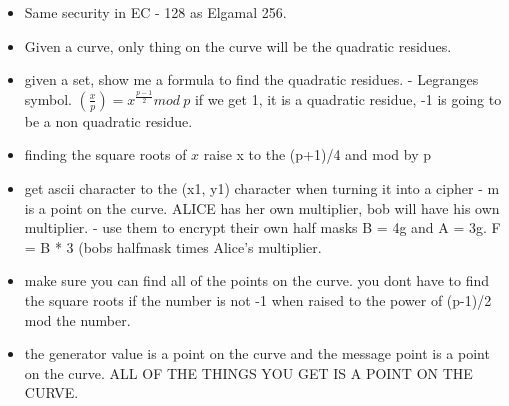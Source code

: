 \documentclass[12pt]{amsart}
\begin{document}
\begin{itemize}
	\begin{itemize}
	\item{}Same security in EC - 128 as Elgamal 256.\\
	\item{}Given a curve, only thing on the curve will be the quadratic residues.\\
	\item{}given a set, show me a formula to find the quadratic residues. - Legranges symbol. $(\frac{x}{p}) = x ^{\frac{p-1}{2}} mod\ p$ if we get 1, it is a quadratic residue, -1 is going to be a non quadratic residue.\\
	\item{}finding the square roots of $x$ raise x to the (p+1)/4 and mod by p\\
	\item{}get ascii character to the (x1, y1) character when turning it into a cipher - m is a point on the curve.  ALICE has her own multiplier, bob will have his own multiplier. - use them to encrypt their own half masks B = 4g and A = 3g.  F = B * 3 (bobs halfmask times Alice's multiplier.\\
	\item{}make sure you can find all of the points on the curve. you dont have to find the square roots if the number is not -1 when raised to the power of (p-1)/2 mod the number.
	\item{}the generator value is a point on the curve and the message point is a point on the curve.  ALL OF THE THINGS YOU GET IS A POINT ON THE CURVE.
	\end{itemize}
\end{itemize}
\end{document}
